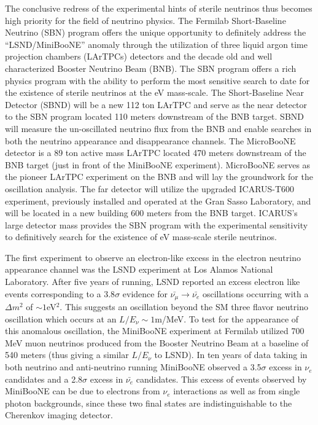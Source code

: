 \label{sec:IF_SBNintro}
The conclusive redress of the experimental hints of sterile neutrinos thus becomes high priority for the field of neutrino physics. The Fermilab Short-Baseline Neutrino (SBN) program offers the unique opportunity to definitely address the ``LSND/MiniBooNE'' anomaly through the utilization of three liquid argon time projection chambers (LArTPCs) detectors and the decade old and well characterized Booster Neutrino Beam (BNB). The SBN program offers a rich physics program with the ability to perform the most sensitive search to date for the existence of sterile neutrinos at the eV mass-scale. The Short-Baseline Near Detector (SBND) will be a new 112 ton LArTPC and serve as the near detector to the SBN program located 110 meters downstream of the BNB target. SBND will measure the un-oscillated neutrino flux from the BNB and enable searches in both the neutrino appearance and disappearance channels. The MicroBooNE detector is a 89 ton active mass LArTPC located 470 meters downstream of the BNB target (just in front of the MiniBooNE experiment). MicroBooNE serves as the pioneer LArTPC experiment on the BNB and will lay the groundwork for the oscillation analysis. The far detector will utilize the upgraded ICARUS-T600 experiment, previously installed and operated at the Gran Sasso Laboratory, and will be located in a new building 600 meters from the BNB target. ICARUS's large detector mass provides the SBN program with the experimental sensitivity to definitively search for the existence of eV mass-scale sterile neutrinos.


The first experiment to observe an electron-like excess in the electron neutrino appearance channel was the LSND experiment \cite{No16} at Los Alamos National Laboratory. After five years of running, LSND reported an excess electron like events corresponding to a 3.8$\sigma$ evidence for $\bar{\nu_{\mu}} \rightarrow \bar{\nu_{e}}$ oscillations occurring with a $\Delta m^{2}$ of $\sim 1$eV$^{2}$. This suggests an oscillation beyond the SM three flavor neutrino oscillation which occurs at an $L/E_{\nu} \sim 1$m/MeV. To test for the appearance of this anomalous oscillation, the MiniBooNE experiment \cite{No17} at Fermilab utilized 700 MeV muon neutrinos produced from the Booster Neutrino Beam at a baseline of 540 meters (thus giving a similar $L/E_{\nu}$ to LSND). In ten years of data taking in both neutrino and anti-neutrino running MiniBooNE observed a 3.5$\sigma$ excess in $\nu_{e}$ candidates and a 2.8$\sigma$ excess in $\bar{\nu_{e}}$ candidates. This excess of events observed by MiniBooNE can be due to electrons from $\nu_{e}$ interactions as well as from single photon backgrounds, since these two final states are indistinguishable to the Cherenkov imaging detector.


